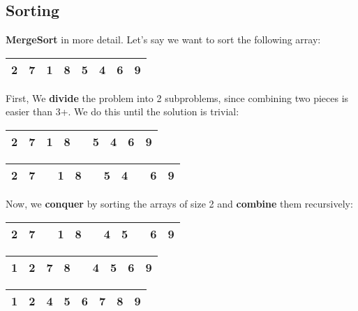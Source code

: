 \documentclass[11pt]{article}
\begin{document}
\subsection{Sorting}
\textbf{MergeSort} in more detail. Let's say we want to sort the following array:
\begin{table}[H]
    \centering
    \begin{tabular}{|c|c|c|c|c|c|c|c|}
    \hline
    2 & 7 & 1 & 8 & 5 & 4 & 6 & 9 \\
    \hline
    \end{tabular}
\end{table}
First, We \textbf{divide} the problem into 2 subproblems, since combining two pieces is easier than 3+. We do this until the solution is trivial:
\begin{table}[H]
    \centering
    \begin{tabular}{|c|c|c|c|c|c|c|c|c|}
    \hline
    2 & 7 & 1 & 8 & & 5 & 4 & 6 & 9 \\
    \hline
    \end{tabular}
    
    \vspace{12pt}
    \begin{tabular}{|c|c|c|c|c|c|c|c|c|c|c|}
    \hline
    2 & 7 & & 1 & 8 & & 5 & 4 & & 6 & 9 \\
    \hline
    \end{tabular}
\end{table}

Now, we \textbf{conquer} by sorting the arrays of size 2 and \textbf{combine} them recursively:
\begin{table}[H]
    \centering
    \begin{tabular}{|c|c|c|c|c|c|c|c|c|c|c|}
    \hline
    2 & 7 & & 1 & 8 & & 4 & 5 & & 6 & 9 \\
    \hline
    \end{tabular}
    
    \vspace{12pt}
    \begin{tabular}{|c|c|c|c|c|c|c|c|c|}
    \hline
    1 & 2 & 7 & 8 & & 4 & 5 & 6 & 9 \\
    \hline
    \end{tabular}

    \vspace{12pt}
    \begin{tabular}{|c|c|c|c|c|c|c|c|}
    \hline
    1 & 2 & 4 & 5 & 6 & 7 & 8 & 9 \\
    \hline
    \end{tabular}
\end{table}
\end{document}
